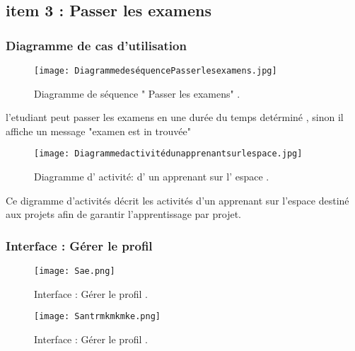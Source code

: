 \subsection{item 3 : Passer les examens}
\subsubsection{Diagramme de cas d’utilisation }


\begin{figure}[ht]
	\centering
	\texttt{[image: DiagrammedeséquencePasserlesexamens.jpg]}
	\caption{Diagramme de séquence " Passer les examens" .}
	\label{fig:Diagramme de séquence " Passer les examens" }
\end{figure}
\FloatBarrier


l’etudiant peut passer les examens en une durée du temps detérminé , sinon il affiche un
message "examen est in trouvée"

\begin{figure}[ht]
	\centering
	\texttt{[image: Diagrammedactivitédunapprenantsurlespace.jpg]}
	\caption{Diagramme d' activité: d' un apprenant sur l' espace .}
	\label{fig:Diagramme d' activité: d' un apprenant sur l' espace }
\end{figure}
\FloatBarrier

Ce digramme d’activités décrit les activités d’un apprenant sur l’espace destiné aux projets
afin de garantir l’apprentissage par projet.



\subsubsection{ Interface : Gérer le profil  }

\clearpage
\begin{figure}[ht]
	\centering
	\texttt{[image: Sae.png]}
	\caption{Interface : Gérer le profil .}
	\label{fig:Interface : Gérer le profil }
\end{figure}
\FloatBarrier

\begin{figure}[ht]
	\centering
	\texttt{[image: Santrmkmkmke.png]}
	\caption{Interface : Gérer le profil .}
	\label{fig:Interface : Gérer le profil }
\end{figure}
\FloatBarrier


